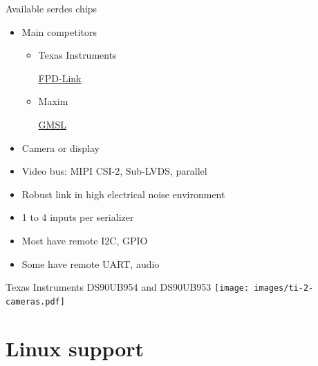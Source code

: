 \documentclass[xetex,table,aspectratio=169]{beamer}
\newcommand{\myhref}[2]{
  \href{#1}{#2 {\tiny\faExternalLink{}}}
}
\begin{document}
\begin{frame}{Available serdes chips}
  \begin{itemize}
  \item Main competitors
    \begin{itemize}
    \item Texas Instruments
      \myhref{http://www.ti.com/interface/fpd-link-serdes/products.html}{FPD-Link}
    \item Maxim
      \myhref{https://www.maximintegrated.com/en/products/interface/high-speed-signaling/gmsl-serdes.html}{GMSL}
    \end{itemize}
  \item Camera or display
  \item Video bus: MIPI CSI-2, Sub-LVDS, parallel
  \item Robust link in high electrical noise environment
  \item 1 to 4 inputs per serializer
  \item Most have remote I2C, GPIO
  \item Some have remote UART, audio
  \end{itemize}
\end{frame}

\begin{frame}{Texas Instruments DS90UB954 and DS90UB953}
  \center\texttt{[image: images/ti-2-cameras.pdf]}
\end{frame}


\section{Linux support}
\end{document}
